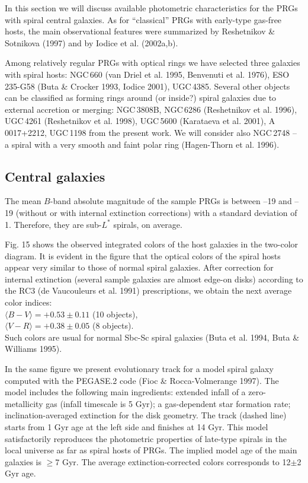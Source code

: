 \documentclass[]{aa}
\begin{document}
In this section we will discuss available photometric characteristics
for the PRGs with spiral central galaxies. As for ``classical'' PRGs
with early-type gas-free hosts, the main observational features were
summarized by Reshetnikov \& Sotnikova (1997) and by Iodice et al. (2002a,b).

Among relatively regular PRGs with optical rings we have selected three 
galaxies with spiral hosts: NGC\,660 (van Driel et al. 1995, 
Benvenuti et al. 1976), 
ESO\,235-G58 (Buta \& Crocker 1993, Iodice 2001), UGC\,4385. 
Several other objects can be classified as forming rings around
(or inside?) spiral galaxies due to external accretion or
merging: NGC\,3808B, NGC\,6286 (Reshetnikov et al. 1996), 
UGC\,4261 (Reshetnikov et al. 1998), UGC\,5600 (Karataeva et al. 2001),
A\,0017+2212, UGC\,1198 
from the present work. We will consider also NGC\,2748 -- a spiral with 
a very smooth and faint polar ring (Hagen-Thorn et al. 1996).

\subsection{Central galaxies}

The mean $B$-band absolute magnitude of the sample PRGs is between --19
and --19 (without or with internal extinction corrections) with a
standard deviation of 1. Therefore, they are sub-$L^*$ spirals, 
on average.

Fig. 15 shows the observed integrated colors of the host galaxies 
in the two-color diagram. It is evident in the figure that
the optical colors of the spiral hosts
appear very similar to those of normal spiral galaxies. 
After correction for internal extinction (several sample galaxies are
almost edge-on disks) according to the RC3 (de Vaucouleurs et al. 1991) 
prescriptions, we obtain the next average color indices: \\
\hspace*{1.2cm}$\langle B-V \rangle = +0.53 \pm 0.11$ (10 objects),\\
\hspace*{1.2cm}$\langle V-R \rangle = +0.38 \pm 0.05$ (8 objects).\\
Such colors are usual for normal Sbc-Sc spiral galaxies 
(Buta et al. 1994, Buta \& Williams 1995).

In the same figure we present evolutionary track for a model
spiral galaxy computed with the PEGASE.2 code (Fioc \& Rocca-Volmerange 1997).
The model includes the following main ingredients: extended infall
of a zero-metallicity gas (infall timescale is 5 Gyr);
a gas-dependent star formation rate; inclination-averaged extinction
for the disk geometry. The track (dashed line) starts from 1 Gyr age at 
the left side and finishes at 14 Gyr. This model satisfactorily reproduces
the photometric properties of late-type spirals in the local universe
as far as spiral hosts of PRGs. The implied model age of the main
galaxies is $\geq$7 Gyr. The average extinction-corrected colors 
corresponds to 12$\pm$2 Gyr age.
\end{document}
